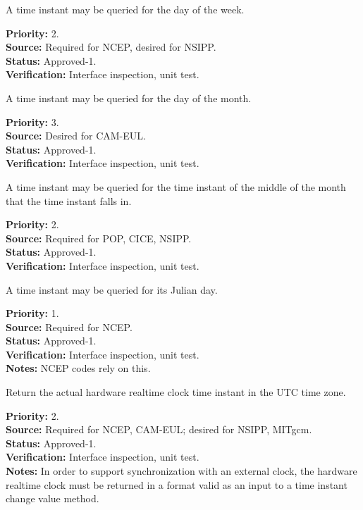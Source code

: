 A time instant may be queried for the day of the week.
\begin{reqlist}
{\bf Priority:} 2. \\
{\bf Source:} Required for NCEP, desired for NSIPP. \\
{\bf Status:} Approved-1. \\
{\bf Verification:} Interface inspection, unit test. 
\end{reqlist}

A time instant may be queried for the day of the month.
\begin{reqlist}
{\bf Priority:} 3. \\
{\bf Source:} Desired for CAM-EUL. \\
{\bf Status:} Approved-1. \\
{\bf Verification:} Interface inspection, unit test. 
\end{reqlist}

A time instant may be queried for the time instant of the middle of the month
that the time instant falls in.
\begin{reqlist}
{\bf Priority:} 2. \\
{\bf Source:} Required for POP, CICE, NSIPP. \\
{\bf Status:} Approved-1. \\
{\bf Verification:} Interface inspection, unit test. 
\end{reqlist}

A time instant may be queried for its Julian day.
\begin{reqlist}
{\bf Priority:} 1. \\
{\bf Source:} Required for NCEP. \\
{\bf Status:} Approved-1. \\
{\bf Verification:} Interface inspection, unit test. \\
{\bf Notes:} NCEP codes rely on this. 
\end{reqlist}

Return the actual hardware realtime clock time instant in the UTC time zone.  

\begin{reqlist}
{\bf Priority:} 2. \\
{\bf Source:} Required for NCEP, CAM-EUL; desired for NSIPP, MITgcm. \\
{\bf Status:} Approved-1. \\
{\bf Verification:} Interface inspection, unit test. \\
{\bf Notes:} In order to support synchronization with an external clock, the hardware 
realtime clock must be returned in a format valid as an input to a time instant change 
value method.
\end{reqlist}

